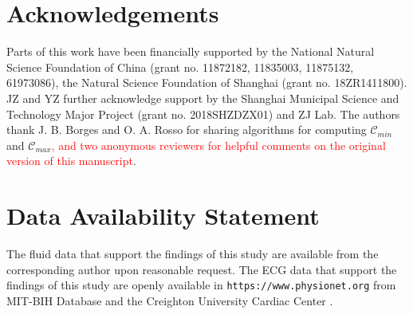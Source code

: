 \documentclass[aip,cha,reprint,nofootinbib]{revtex4-1}
\begin{document}
\section*{Acknowledgements}
Parts of this work have been financially supported by the National Natural Science Foundation of China (grant no. 11872182, 11835003, 11875132, 61973086), the Natural Science Foundation of Shanghai (grant no. 18ZR1411800). JZ and YZ further acknowledge support by the Shanghai Municipal Science and Technology Major Project (grant no. 2018SHZDZX01) and ZJ Lab. The authors thank J. B. Borges and O. A. Rosso for sharing algorithms for computing $\mathcal{C}_{min}$ and $\mathcal{C}_{max}$\textcolor{red}{, and two anonymous reviewers for helpful comments on the original version of this manuscript}. 

\section*{Data Availability Statement}
The fluid data that support the findings of this study are available from the corresponding author upon reasonable request. The ECG data that support the findings of this study are openly available in {\tt https://www.physionet.org} from MIT-BIH Database and the Creighton University Cardiac Center \cite{GoldbergerMITBIH2000}. 



\end{document}
